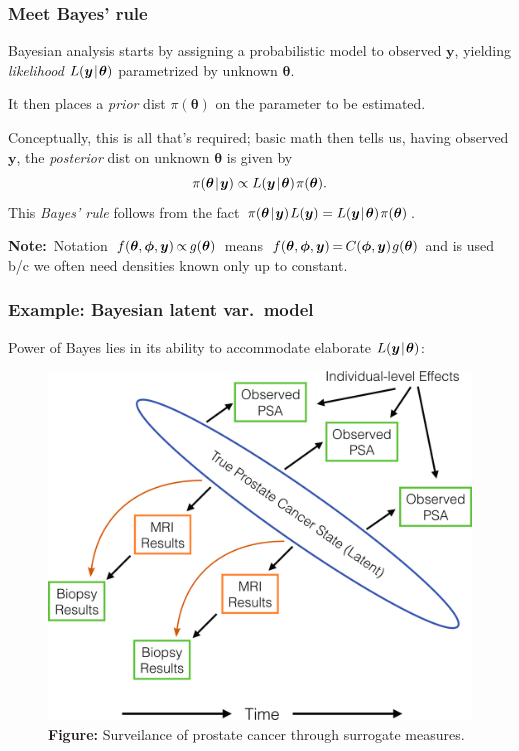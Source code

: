 \documentclass[18pt]{beamer}
\newcommand{\defineTightSpacing}{%
	\setlength{\abovedisplayskip}{.25\baselineskip}%
	\setlength{\belowdisplayskip}{.25\baselineskip}%
}
\newcommand{\given}{\thinnerspace | \thinnerspace}
\newcommand{\thinnerspace}{\mskip.5\thinmuskip}
\newcommand{\negthinnerspace}{\mskip-.5\thinmuskip}
\newcommand{\density}{\pi}
\newcommand{\likelihood}{L}
\newcommand{\by}{\bm{y}}
\newcommand{\btheta}{\bm{\theta}}
\begin{document}
\begin{frame}
\frametitle{Meet Bayes' rule}

Bayesian analysis starts by assigning a probabilistic model to observed $\by$, yielding \textit{likelihood} $\likelihood(\by \given \btheta)$ parametrized by unknown $\btheta$.

\pause
\smallskip
It then places a \textit{prior} dist $\density(\btheta)$ on the parameter to be estimated.

\pause
\smallskip
Conceptually, this is all that's required; 
basic math then tells us, having observed $\by$, the \textit{posterior} dist on unknown $\btheta$ is given by
\begin{equation*} \defineTightSpacing%
\density(\btheta \given \by) 
	\propto \likelihood(\by \given \btheta) \thinnerspace \density(\btheta).
\end{equation*}
\pause%
This \textit{Bayes' rule} follows from the fact $\thinnerspace \density(\btheta \given \by) \thinnerspace \likelihood(\by) = \likelihood(\by \given \btheta) \thinnerspace \density(\btheta)$.

\pause
\smallskip
\mbox{\textbf{Note:} Notation $f(\btheta, \bm{\phi}, \by) \negthinnerspace \propto \negthinnerspace g(\btheta)$ means $f(\btheta, \bm{\phi}, \by) \negthinnerspace = \negthinnerspace C(\bm{\phi}, \by) \thinnerspace g(\btheta)$}
and is used b/c we often need densities known only up to constant.

\end{frame}


\begin{frame}
\frametitle{Example: Bayesian latent var.\ model}

Power of Bayes lies in its ability to accommodate elaborate $\likelihood(\by \given \btheta)$:

\pause
\begin{figure}
\centering
\includegraphics[width=.6\linewidth]{Figure/active_surveillence_model_with_mri}

\vspace*{.1\baselineskip}
\caption*{\textcolor{themecolor}{\textbf{Figure:}}
	Surveilance of prostate cancer through surrogate measures.%
}%
\end{figure}

\end{frame}
\end{document}
